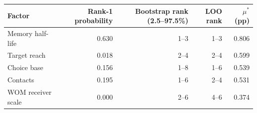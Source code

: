 \begin{tabular}{lrrrr}
\toprule
Factor & Rank-1 probability & Bootstrap rank (2.5--97.5\%) & LOO rank & $\mu^*$ (pp) \\
\midrule
Memory half-life & 0.630 & 1--3 & 1--3 & 0.806 \\
Target reach & 0.018 & 2--4 & 2--4 & 0.599 \\
Choice base & 0.156 & 1--8 & 1--6 & 0.539 \\
Contacts & 0.195 & 1--6 & 2--4 & 0.531 \\
WOM receiver scale & 0.000 & 2--6 & 4--6 & 0.374 \\
\bottomrule
\end{tabular}
